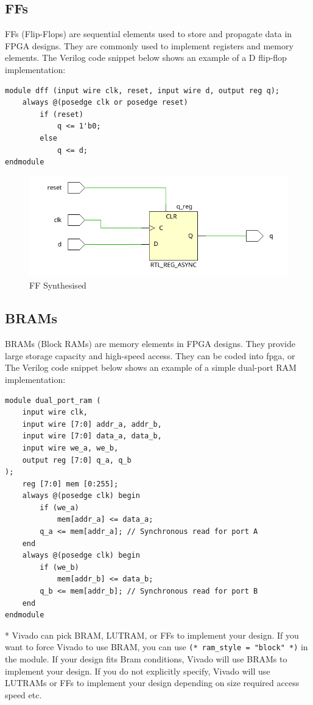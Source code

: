 \documentclass{report}
\begin{document}
\subsection{FFs}
FFs (Flip-Flops) are sequential elements used to store and propagate data in FPGA designs. They are commonly used to implement registers and memory elements. The Verilog code snippet below shows an example of a D flip-flop implementation:

\begin{verbatim}
module dff (input wire clk, reset, input wire d, output reg q);
    always @(posedge clk or posedge reset)
        if (reset)
            q <= 1'b0;
        else
            q <= d;
endmodule
\end{verbatim}

\begin{figure}[ht]
    \includegraphics[width=0.6\linewidth]{images/ff.png}
    \centering
    \caption{FF Synthesised}
    \label{fig:ff}
\end{figure}

\subsection{BRAMs}
BRAMs (Block RAMs) are memory elements in FPGA designs. They provide large storage capacity and high-speed access. They can be coded into fpga, or The Verilog code snippet below shows an example of a simple dual-port RAM implementation:
\begin{verbatim}
module dual_port_ram (
    input wire clk,
    input wire [7:0] addr_a, addr_b,
    input wire [7:0] data_a, data_b,
    input wire we_a, we_b,
    output reg [7:0] q_a, q_b
);
    reg [7:0] mem [0:255];
    always @(posedge clk) begin
        if (we_a)
            mem[addr_a] <= data_a;
        q_a <= mem[addr_a]; // Synchronous read for port A
    end
    always @(posedge clk) begin
        if (we_b)
            mem[addr_b] <= data_b;
        q_b <= mem[addr_b]; // Synchronous read for port B
    end
endmodule
\end{verbatim}

* Vivado can pick BRAM, LUTRAM, or FFs to implement your design. If you want to force Vivado to use BRAM, you can use \texttt{(* ram\_style = "block" *)} in the module. If your design fits Bram conditions, Vivado will use BRAMs to implement your design. If you do not explicitly specify, Vivado will use LUTRAMs or FFs to implement your design depending on size required access speed etc.
\end{document}
